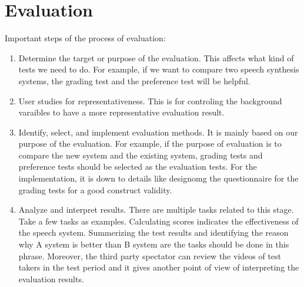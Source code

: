 \documentclass[12pt]{article}
\newenvironment{problem}[2][Problem]{\begin{trivlist}
\item[\hskip \labelsep {\bfseries #1}\hskip \labelsep {\bfseries #2.}]}{\end{trivlist}}
\begin{document}
\section{Evaluation}
\begin{problem}{5.1}
    Important steps of the process of evaluation:
    \begin{enumerate}
        \item Determine the target or purpose of the evaluation. This affects what kind
        of tests we need to do. For example, if we want to compare two
        speech synthesis systems, the grading test and the preference test will
        be helpful.

        \item User studies for representativeness. This is for controling the
        background varaibles to have a more representative evaluation
        result.

        \item Identify, select, and implement evaluation methods.
        It is mainly based on our purpose of the evaluation. For example, if the
        purpose of evaluation is to compare the new system and the existing system,
        grading tests and preference tests should be selected as the evaluation
        tests. For the implementation, it is down to details like designomg
        the questionnaire for the grading tests for a good construct validity.

        \item  Analyze and interpret results.
        There are multiple tasks related to this stage. Take a few tasks as examples.
        Calculating scores indicates the effectiveness of the speech system.
        Summerizing the test results and identifying the reason why A system is
        better than B system are the tasks should be done in this phrase. Moreover,
        the third party spectator can review the videos of test takers in 
        the test period and it gives another point of view of interpreting 
        the evaluation results.

    \end{enumerate}
\end{problem}
\end{document}
